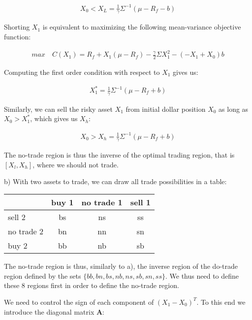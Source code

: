 \documentclass[10pt]{article}
\begin{document}
\begin{align*}
	X_0 < X_L = \frac{1}{\gamma} \Sigma^{-1} (\mu - R_f  - b)
\end{align*}

Shorting $X_1$ is equivalent to maximizing the following mean-variance objective function:

\begin{align*}
	max \quad C(X_1) = R_f + X_1(\mu - R_f) - \frac{\gamma}{2} \Sigma X_1^2 - (-X_1 + X_0)b
\end{align*}

Computing the first order condition with respect to $X_1$ gives us:

\begin{align*}
	X_1^* =\frac{1}{\gamma} \Sigma^{-1} (\mu - R_f + b)
\end{align*}

Similarly, we can sell the risky asset $X_1$ from initial dollar position $X_0$ as long as $X_0 > X_1^*$, which gives us $X_h$:

\begin{align*}
	X_0 > X_h = \frac{1}{\gamma} \Sigma^{-1} (\mu - R_f + b)
\end{align*}

The no-trade region is thus the inverse of the optimal trading region, that is $[X_l, X_h]$, where we should not trade.

\bigbreak

b) With two assets to trade, we can draw all trade possibilities in a table:

\begin{center}
\begin{tabular}{|l|c|c|c|}
\hline
           & \multicolumn{1}{l|}{buy 1} & \multicolumn{1}{l|}{no trade 1} & \multicolumn{1}{l|}{sell 1} \\ \hline
sell 2      & bs  & ns & ss \\ \hline
no trade 2 & bn  & nn & sn \\ \hline
buy 2     & bb & nb & sb  \\ \hline
\end{tabular}
\end{center}

The no-trade region is thus, similarly to a), the inverse region of the do-trade region defined by the sets $\{bb, bn, bs, nb, ns, sb, sn, ss\}$. We thus need to define these 8 regions first in order to define the no-trade region.

\smallbreak

We need to control the sign of each component of $(X_1 - X_0)^T$. To this end we introduce the diagonal matrix \textbf{A}:
\end{document}
